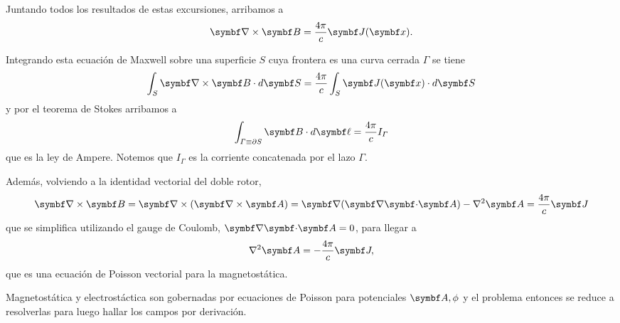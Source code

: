\documentclass[10pt,oneside]{CBFT_book}
\begin{document}
Juntando todos los resultados de estas excursiones, arribamos a 
\[
	\rotorm{B} = \frac{4 \pi} {c} \vb{J}(\vb{x}).
\]

Integrando esta ecuación de Maxwell sobre una superficie $S$ cuya frontera es una curva
cerrada $\Gamma$ se tiene 
\[
	\int_S \rotorm{B} \cdot d\vb{S} = \frac{4\pi}{c} \int_S \vb{J}(\vb{x}) \cdot d\vb{S}
\]
y por el teorema de Stokes arribamos a
\[
	\int_{\Gamma\equiv\partial S} \vb{B}\cdot d\vb{\ell} = \frac{4\pi}{c} I_\Gamma
\]
que es la ley de Ampere. Notemos que $I_\Gamma$ es la corriente concatenada por el lazo $\Gamma$.

Además, volviendo a la identidad vectorial del doble rotor, 
\[
	\rotorm{B} = \Nabla\times(\rotorm{A}) = \Nabla(\divem{A}) - \nabla^2 \vb{A} = \frac{4\pi}{c}\vb{J}
\]
que se simplifica utilizando el gauge de Coulomb, $\divem{A}=0$, para llegar a 
\[
	\nabla^2 \vb{A} = -\frac{4\pi}{c}\vb{J},
\]
que es una ecuación de Poisson vectorial para la magnetostática.

Magnetostática y electrostáctica son gobernadas por ecuaciones de Poisson para potenciales $\vb{A},\phi$ y
el problema entonces se reduce a resolverlas para luego hallar los campos por derivación.
\end{document}
